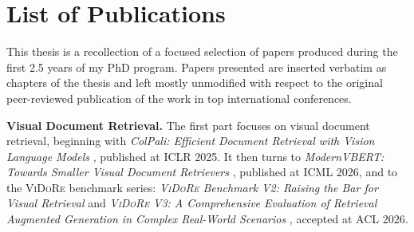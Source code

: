 \section{List of Publications}

This thesis is a recollection of a focused selection of
papers produced during the first 2.5 years of my PhD program. Papers presented are inserted verbatim as chapters of the thesis and left mostly unmodified with respect to the original peer-reviewed publication of the work in top international conferences.


\noindent\textbf{Visual Document Retrieval.} The first part focuses on visual document retrieval, beginning with
\emph{ColPali: Efficient Document Retrieval with Vision Language Models}
, published at ICLR 2025. It then turns to
\emph{ModernVBERT: Towards Smaller Visual Document Retrievers}
, published at ICML 2026, and to the \textsc{ViDoRe} benchmark series:
\emph{\textsc{ViDoRe} Benchmark V2: Raising the Bar for Visual Retrieval} and
\emph{\textsc{ViDoRe} V3: A Comprehensive Evaluation of Retrieval Augmented Generation in Complex Real-World Scenarios}
, accepted at ACL 2026.


